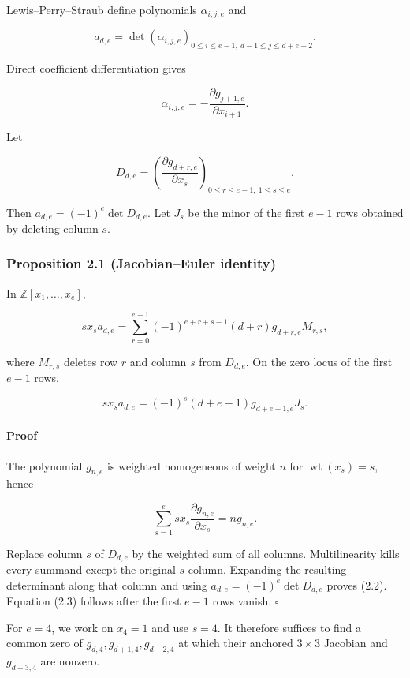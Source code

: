 \documentclass[
  11pt,
  a4paper,
]{article}
\begin{document}
Lewis--Perry--Straub define polynomials \(\alpha_{i,j,e}\) and

\[
a_{d,e}=\det(\alpha_{i,j,e})_{
0\le i\le e-1,\ d-1\le j\le d+e-2}.
\]

Direct coefficient differentiation gives

\[
\alpha_{i,j,e}=-\frac{\partial g_{j+1,e}}{\partial x_{i+1}}.
\tag{2.1}
\]

Let

\[
D_{d,e}=\left(\frac{\partial g_{d+r,e}}{\partial x_s}\right)_ {
0\le r\le e-1,\ 1\le s\le e}.
\]

Then \(a_{d,e}=(-1)^e\det D_{d,e}\). Let \(J_s\) be the minor of the
first \(e-1\) rows obtained by deleting column \(s\).

\subsubsection{Proposition 2.1 (Jacobian--Euler
identity)}\label{proposition-2.1-jacobianeuler-identity}

In \(\mathbb Z[x_1,\ldots,x_e]\),

\[
s x_s a_{d,e}=
\sum_{r=0}^{e-1}(-1)^{e+r+s-1}(d+r)g_{d+r,e}M_{r,s},
\tag{2.2}
\]

where \(M_{r,s}\) deletes row \(r\) and column \(s\) from \(D_{d,e}\).
On the zero locus of the first \(e-1\) rows,

\[
s x_s a_{d,e}=(-1)^s(d+e-1)g_{d+e-1,e}J_s.
\tag{2.3}
\]

\paragraph{Proof}\label{proof}

The polynomial \(g_{n,e}\) is weighted homogeneous of weight \(n\) for
\(\operatorname{wt}(x_s)=s\), hence

\[
\sum_{s=1}^e sx_s\frac{\partial g_{n,e}}{\partial x_s}=ng_{n,e}.
\]

Replace column \(s\) of \(D_{d,e}\) by the weighted sum of all columns.
Multilinearity kills every summand except the original \(s\)-column.
Expanding the resulting determinant along that column and using
\(a_{d,e}=(-1)^e\det D_{d,e}\) proves (2.2). Equation (2.3) follows
after the first \(e-1\) rows vanish. \(\square\)

For \(e=4\), we work on \(x_4=1\) and use \(s=4\). It therefore suffices
to find a common zero of \(g_{d,4},g_{d+1,4},g_{d+2,4}\) at which their
anchored \(3\times3\) Jacobian and \(g_{d+3,4}\) are nonzero.
\end{document}
